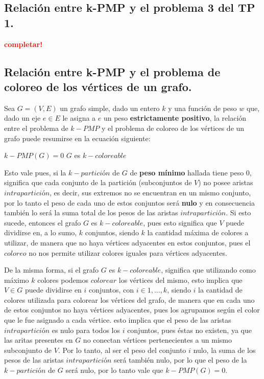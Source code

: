 \subsection{Relación entre k-PMP y el problema 3 del TP 1.}
\vspace*{0.3cm}
\textcolor{red}{\textbf{completar!}}



\newpage
\subsection{Relación entre k-PMP y el problema de coloreo de los vértices de
            un grafo.}
\vspace*{0.3cm}

Sea $G = (V, E)$ un grafo simple, dado un entero $k$ y una función de peso $w$ 
que, dado un eje $e \in E$ le asigna a $e$ un peso \textbf{estrictamente positivo},
la relación entre el problema de $k-PMP$ y el problema de coloreo de los vértices 
de un grafo puede resumirse en la ecuación siguiente:

\begin{center}
  $k-PMP(G) = 0$ \iff $G$ es $k-coloreable$
\end{center}

Esto vale pues, si la $k-partición$ de $G$ de \textbf{peso mínimo} hallada 
tiene peso 0, significa que cada conjunto de la partición (subconjuntos de $V$) 
no posee aristas $intrapartición$, es decir, sus extremos no se encuentran en 
un mismo conjunto, por lo tanto el peso de cada uno de estos conjuntos será 
\textbf{nulo} y en consecuencia también lo será la suma total de los pesos de 
las aristas $intrapartición$. Si esto sucede, entonces el grafo $G$ es 
$k-coloreable$, pues esto significa que $V$ puede dividirse en, a lo sumo, $k$ 
conjuntos, siendo $k$ la cantidad máxima de colores a utilizar, de manera que no 
haya vértices adyacentes en estos conjuntos, pues el $coloreo$ no nos permite 
utilizar colores iguales para vértices adyacentes.

De la misma forma, si el grafo $G$ es $k-coloreable$, significa que utilizando 
como máximo $k$ colores podemos $colorear$ los vértices del mismo, esto implica 
que $V \in G$ puede dividirse en $i$ conjuntos, con $i \in {1,...,k}$, siendo $i$ 
la cantidad de colores utilizada para colorear los vértices del grafo, de manera 
que en cada uno de estos conjuntos no haya vértices adyacentes, pues los agrupamos 
según el color que le fue asignado a cada vértice. esto implica que el peso de 
las aristas $intrapartición$ es nulo para todos los $i$ conjuntos, pues éstas no 
existen, ya que las aritas presentes en $G$ no conectan vértices pertenecientes a 
un mismo subconjunto de $V$. Por lo tanto, al ser el peso del conjunto $i$ nulo, 
la suma de los pesos de las aristas $intrapartición$ será también nulo, por lo 
que el peso de la $k-partición$ de $G$ será nulo, por lo tanto vale que $k-PMP(G) = 0$.


